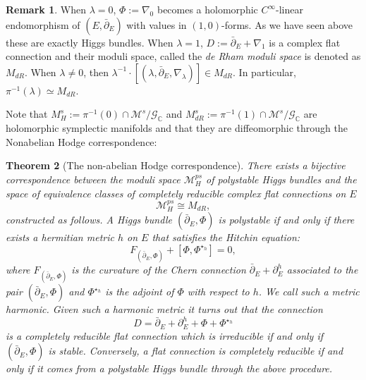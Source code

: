 \documentclass[12pt,oneside,reqno]{amsart}
\newtheorem{theorem}{Theorem}
\theoremstyle{definition}
\newtheorem{remark}[theorem]{Remark}
\numberwithin{equation}{section}
\numberwithin{theorem}{section}
\newcommand{\pa}{\partial}
\newcommand{\delbar}{\bar\pa}
\begin{document}
\begin{remark} When $\lambda = 0$, $\Phi := \nabla_0$ becomes a holomorphic $C^\infty$-linear endomorphism of $(E, \delbar_E)$ with values in $(1,0)$-forms. As we have seen above these are exactly Higgs bundles. When $\lambda = 1$, $D:= \bar\pa_E + \nabla_1$ is a complex flat connection and their moduli space, called the \textit{de Rham moduli space} is denoted as $M_{dR}$. When $\lambda \neq 0$, then $\lambda^{-1}\cdot[(\lambda,\bar\pa_E,\nabla_{\lambda})] \in M_{dR}$. In particular, $\pi ^{-1} (\lambda) \simeq M_{dR}$.
\end{remark}

Note that $M_H^s:= \pi^{-1}(0)\cap\mathcal M^s/\mathcal G_{\mathbb C}$ and $M_{dR}^s := \pi^{-1}(1)\cap\mathcal M^s/\mathcal G_{\mathbb C}$ are holomorphic symplectic manifolds and that they are diffeomorphic through the Nonabelian Hodge correspondence:

%
\begin{theorem}[The non-abelian Hodge correspondence]
There exists a bijective correspondence between the moduli space $\mathcal M^{ps}_H$ of polystable Higgs bundles and the space of equivalence classes of completely reducible complex flat connections on $E$
%
\begin{equation*}
    \mathcal M_H^{ps}\cong M_{dR},
\end{equation*}
constructed as follows. A Higgs bundle $(\bar\pa_E,\Phi)$ is polystable if and only if there exists a hermitian metric $h$ on $E$ that satisfies the Hitchin equation: 
%
\begin{equation*}\label{Hitchineq}
F_{(\bar\pa_E,\Phi)} + [\Phi,\Phi^{\star_h}] = 0,
\end{equation*}
%
where $F_{(\bar\pa_E,\Phi)}$ is the curvature of the Chern connection $\bar\pa_E+ \pa_E^h$ associated to the pair $(\bar\pa_E,\Phi)$ and $\Phi^{\star_h}$ is the adjoint of $\Phi$ with respect to $h$. We call such a metric \emph{harmonic}. Given such a harmonic metric it turns out that the connection 
%
\begin{equation*}
D = \bar\pa_E+ \pa_E^h + \Phi+ \Phi^{\star_h}
\end{equation*}
%
is a completely reducible flat connection which is irreducible if and only if $(\bar\pa_E,\Phi)$ is stable. Conversely, a flat connection is completely reducible if and only if it comes from a polystable Higgs bundle through the above procedure. 
\end{theorem}
%
\end{document}
